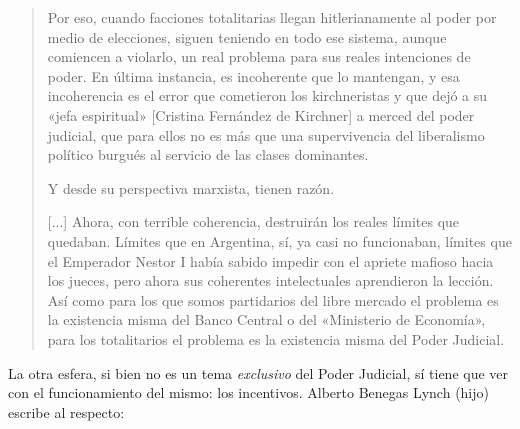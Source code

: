 \documentclass[12pt,a4paper,twoside]{book}
\begin{document}
\begin{quotation}
Por eso, cuando facciones totalitarias llegan hitlerianamente al poder por medio de elecciones, siguen teniendo en todo ese sistema, aunque comiencen a violarlo, un real problema para sus reales intenciones de poder. En última instancia, es incoherente que lo mantengan, y esa incoherencia es el error que cometieron los kirchneristas y que dejó a su «jefa espiritual» [Cristina Fernández de Kirchner] a merced del poder judicial, que para ellos no es más que una supervivencia del liberalismo político burgués al servicio de las clases dominantes.

Y desde su perspectiva marxista, tienen razón.

[...] Ahora, con terrible coherencia, destruirán los reales límites que quedaban. Límites que en Argentina, sí, ya casi no funcionaban, límites que el Emperador Nestor I había sabido impedir con el apriete mafioso hacia los jueces, pero ahora sus coherentes intelectuales aprendieron la lección. Así como para los que somos partidarios del libre mercado el problema es la existencia misma del Banco Central o del «Ministerio de Economía», para los totalitarios el problema es la existencia misma del Poder Judicial. \cite{gz:poder-judicial}
\end{quotation}

La otra esfera, si bien no es un tema \textit{exclusivo} del Poder Judicial, sí tiene que ver con el funcionamiento del mismo: los incentivos. Alberto Benegas Lynch (hijo) escribe al respecto:
\end{document}
